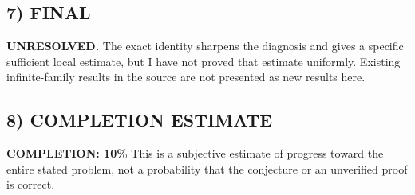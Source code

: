 \subsection*{7) FINAL}
\textbf{UNRESOLVED.} The exact identity sharpens the diagnosis and gives a specific sufficient local estimate, but I have not proved that estimate uniformly. Existing infinite-family results in the source are not presented as new results here.

\subsection*{8) COMPLETION ESTIMATE}
\textbf{COMPLETION: 10\%}
This is a subjective estimate of progress toward the entire stated problem, not a probability that the conjecture or an unverified proof is correct.

